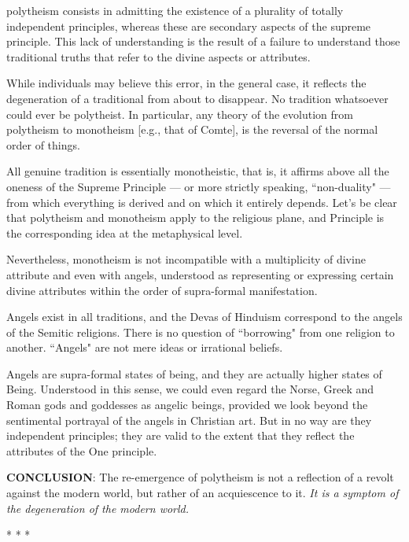 \begin{quotex}
polytheism consists in admitting the existence of a plurality of totally independent principles, whereas these are secondary aspects of the supreme principle. This lack of understanding is the result of a failure to understand those traditional truths that refer to the divine aspects or attributes.

While individuals may believe this error, in the general case, it reflects the degeneration of a traditional from about to disappear. No tradition whatsoever could ever be polytheist. In particular, any theory of the evolution from polytheism to monotheism [e.g., that of Comte], is the reversal of the normal order of things.

All genuine tradition is essentially monotheistic, that is, it affirms above all the oneness of the Supreme Principle — or more strictly speaking, ``non-duality" — from which everything is derived and on which it entirely depends. Let's be clear that polytheism and monotheism apply to the religious plane, and Principle is the corresponding idea at the metaphysical level.

Nevertheless, monotheism is not incompatible with a multiplicity of divine attribute and even with angels, understood as representing or expressing certain divine attributes within the order of supra-formal manifestation. 

\end{quotex}
Angels exist in all traditions, and the Devas of Hinduism correspond to the angels of the Semitic religions. There is no question of ``borrowing" from one religion to another. ``Angels" are not mere ideas or irrational beliefs.

Angels are supra-formal states of being, and they are actually higher states of Being. Understood in this sense, we could even regard the Norse, Greek and Roman gods and goddesses as angelic beings, provided we look beyond the sentimental portrayal of the angels in Christian art. But in no way are they independent principles; they are valid to the extent that they reflect the attributes of the One principle.

\textbf{CONCLUSION}: The re-emergence of polytheism is not a reflection of a revolt against the modern world, but rather of an acquiescence to it. \emph{It is a symptom of the degeneration of the modern world.}




\begin{center}* * *\end{center}

